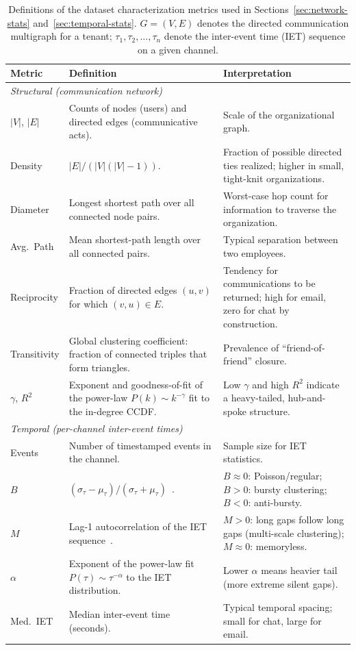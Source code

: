 \begin{table}[h]
\centering
\footnotesize
\caption{Definitions of the dataset characterization metrics used in Sections~\ref{sec:network-stats} and~\ref{sec:temporal-stats}. $G = (V, E)$ denotes the directed communication multigraph for a tenant; $\tau_1, \tau_2, \ldots, \tau_n$ denote the inter-event time (IET) sequence on a given channel.}
\label{tab:metric_defs}
\begin{tabular}{p{2.4cm}p{3.4cm}p{7.0cm}}
\toprule
\textbf{Metric} & \textbf{Definition} & \textbf{Interpretation} \\
\midrule
\multicolumn{3}{l}{\emph{Structural (communication network)}} \\
\midrule
$|V|$, $|E|$ & Counts of nodes (users) and directed edges (communicative acts). & Scale of the organizational graph. \\
Density & $|E| / (|V|(|V|-1))$. & Fraction of possible directed ties realized; higher in small, tight-knit organizations. \\
Diameter & Longest shortest path over all connected node pairs. & Worst-case hop count for information to traverse the organization. \\
Avg.\ Path & Mean shortest-path length over all connected pairs. & Typical separation between two employees. \\
Reciprocity & Fraction of directed edges $(u,v)$ for which $(v,u) \in E$. & Tendency for communications to be returned; high for email, zero for chat by construction. \\
Transitivity & Global clustering coefficient: fraction of connected triples that form triangles. & Prevalence of ``friend-of-friend'' closure. \\
$\gamma$, $R^2$ & Exponent and goodness-of-fit of the power-law $P(k) \sim k^{-\gamma}$ fit to the in-degree CCDF. & Low $\gamma$ and high $R^2$ indicate a heavy-tailed, hub-and-spoke structure. \\
\midrule
\multicolumn{3}{l}{\emph{Temporal (per-channel inter-event times)}} \\
\midrule
Events & Number of timestamped events in the channel. & Sample size for IET statistics. \\
$B$ & $(\sigma_\tau - \mu_\tau) / (\sigma_\tau + \mu_\tau)$~\cite{goh2008burstiness}. & $B \approx 0$: Poisson/regular; $B > 0$: bursty clustering; $B < 0$: anti-bursty. \\
$M$ & Lag-1 autocorrelation of the IET sequence~\cite{goh2008burstiness}. & $M > 0$: long gaps follow long gaps (multi-scale clustering); $M \approx 0$: memoryless. \\
$\alpha$ & Exponent of the power-law fit $P(\tau) \sim \tau^{-\alpha}$ to the IET distribution. & Lower $\alpha$ means heavier tail (more extreme silent gaps). \\
Med.\ IET & Median inter-event time (seconds). & Typical temporal spacing; small for chat, large for email. \\
\bottomrule
\end{tabular}
\end{table}

